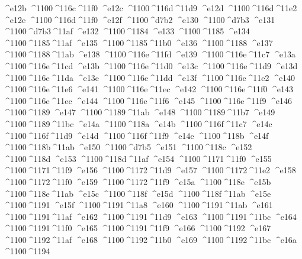 \checkit ^^^^e12b ^^^^1100^^^^116c^^^^11f0
\checkit ^^^^e12c ^^^^1100^^^^116d^^^^11d9
\checkit ^^^^e12d ^^^^1100^^^^116d^^^^11e2
\checkit ^^^^e12e ^^^^1100^^^^116d^^^^11f0
\checkit ^^^^e12f ^^^^1100^^^^d7b2
\checkit ^^^^e130 ^^^^1100^^^^d7b3
\checkit ^^^^e131 ^^^^1100^^^^d7b3^^^^11af
\checkit ^^^^e132 ^^^^1100^^^^1184
\checkit ^^^^e133 ^^^^1100^^^^1185
\checkit ^^^^e134 ^^^^1100^^^^1185^^^^11af
\checkit ^^^^e135 ^^^^1100^^^^1185^^^^11b0
\checkit ^^^^e136 ^^^^1100^^^^1188
\checkit ^^^^e137 ^^^^1100^^^^1188^^^^11ab
\checkit ^^^^e138 ^^^^1100^^^^116e^^^^11fd
\checkit ^^^^e139 ^^^^1100^^^^116e^^^^11c7
\checkit ^^^^e13a ^^^^1100^^^^116e^^^^11cd
\checkit ^^^^e13b ^^^^1100^^^^116e^^^^11d0
\checkit ^^^^e13c ^^^^1100^^^^116e^^^^11d9
\checkit ^^^^e13d ^^^^1100^^^^116e^^^^11da
\checkit ^^^^e13e ^^^^1100^^^^116e^^^^11dd
\checkit ^^^^e13f ^^^^1100^^^^116e^^^^11e2
\checkit ^^^^e140 ^^^^1100^^^^116e^^^^11e6
\checkit ^^^^e141 ^^^^1100^^^^116e^^^^11ec
\checkit ^^^^e142 ^^^^1100^^^^116e^^^^11f0
\checkit ^^^^e143 ^^^^1100^^^^116e^^^^11ec
\checkit ^^^^e144 ^^^^1100^^^^116e^^^^11f6
\checkit ^^^^e145 ^^^^1100^^^^116e^^^^11f9
\checkit ^^^^e146 ^^^^1100^^^^1189
\checkit ^^^^e147 ^^^^1100^^^^1189^^^^11ab
\checkit ^^^^e148 ^^^^1100^^^^1189^^^^11b7
\checkit ^^^^e149 ^^^^1100^^^^1189^^^^11bc
\checkit ^^^^e14a ^^^^1100^^^^118a
\checkit ^^^^e14b ^^^^1100^^^^116f^^^^11c7
\checkit ^^^^e14c ^^^^1100^^^^116f^^^^11d9
\checkit ^^^^e14d ^^^^1100^^^^116f^^^^11f9
\checkit ^^^^e14e ^^^^1100^^^^118b
\checkit ^^^^e14f ^^^^1100^^^^118b^^^^11ab
\checkit ^^^^e150 ^^^^1100^^^^d7b5
\checkit ^^^^e151 ^^^^1100^^^^118c
\checkit ^^^^e152 ^^^^1100^^^^118d
\checkit ^^^^e153 ^^^^1100^^^^118d^^^^11af
\checkit ^^^^e154 ^^^^1100^^^^1171^^^^11f0
\checkit ^^^^e155 ^^^^1100^^^^1171^^^^11f9
\checkit ^^^^e156 ^^^^1100^^^^1172^^^^11d9
\checkit ^^^^e157 ^^^^1100^^^^1172^^^^11e2
\checkit ^^^^e158 ^^^^1100^^^^1172^^^^11f0
\checkit ^^^^e159 ^^^^1100^^^^1172^^^^11f9
\checkit ^^^^e15a ^^^^1100^^^^118e
\checkit ^^^^e15b ^^^^1100^^^^118e^^^^11ab
\checkit ^^^^e15c ^^^^1100^^^^118f
\checkit ^^^^e15d ^^^^1100^^^^118f^^^^11ab
\checkit ^^^^e15e ^^^^1100^^^^1191
\checkit ^^^^e15f ^^^^1100^^^^1191^^^^11a8
\checkit ^^^^e160 ^^^^1100^^^^1191^^^^11ab
\checkit ^^^^e161 ^^^^1100^^^^1191^^^^11af
\checkit ^^^^e162 ^^^^1100^^^^1191^^^^11d9
\checkit ^^^^e163 ^^^^1100^^^^1191^^^^11bc
\checkit ^^^^e164 ^^^^1100^^^^1191^^^^11f0
\checkit ^^^^e165 ^^^^1100^^^^1191^^^^11f9
\checkit ^^^^e166 ^^^^1100^^^^1192
\checkit ^^^^e167 ^^^^1100^^^^1192^^^^11af
\checkit ^^^^e168 ^^^^1100^^^^1192^^^^11b0
\checkit ^^^^e169 ^^^^1100^^^^1192^^^^11bc
\checkit ^^^^e16a ^^^^1100^^^^1194
